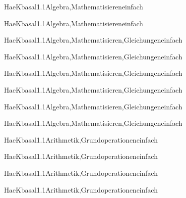 \documentclass[12pt]{article}
\begin{document}
\begin{Add}{HaeK}{basal1.1}{Algebra,Mathematisieren}{einfach}
\solution{ }
\end{Add}
\begin{Add}{HaeK}{basal1.1}{Algebra,Mathematisieren}{einfach}
\end{Add}

\begin{Add}{HaeK}{basal1.1}{Algebra,Mathematisieren,Gleichungen}{einfach}
\solution{ }
\end{Add}
\begin{Add}{HaeK}{basal1.1}{Algebra,Mathematisieren,Gleichungen}{einfach}
\end{Add}

\begin{Add}{HaeK}{basal1.1}{Algebra,Mathematisieren,Gleichungen}{einfach}
\solution{ }
\end{Add}
\begin{Add}{HaeK}{basal1.1}{Algebra,Mathematisieren,Gleichungen}{einfach}
\end{Add}

\begin{Add}{HaeK}{basal1.1}{Algebra,Mathematisieren,Gleichungen}{einfach}
\solution{ }
\end{Add}
\begin{Add}{HaeK}{basal1.1}{Algebra,Mathematisieren,Gleichungen}{einfach}
\end{Add}

\begin{Add}{HaeK}{basal1.1}{Arithmetik,Grundoperationen}{einfach}
\solution{ }
\end{Add}
\begin{Add}{HaeK}{basal1.1}{Arithmetik,Grundoperationen}{einfach}
\end{Add}

\begin{Add}{HaeK}{basal1.1}{Arithmetik,Grundoperationen}{einfach}
\solution{ }
\end{Add}
\begin{Add}{HaeK}{basal1.1}{Arithmetik,Grundoperationen}{einfach}
\end{Add}
\end{document}
